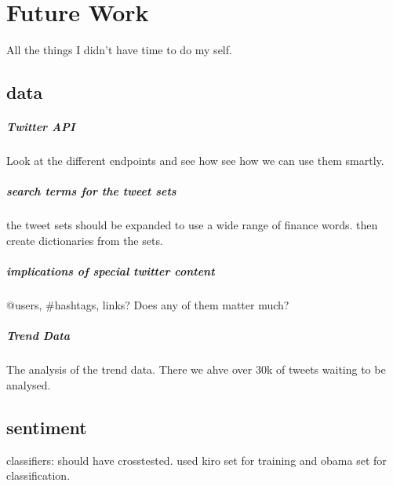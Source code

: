 
\chapter{Future Work}\label{futurework}
All the things I didn't have time to do my self. 

\section{data}
\paragraph{Twitter API}
Look at the different endpoints and see how see how we can use them smartly.

\paragraph{search terms for the tweet sets}
the tweet sets should be expanded to use a wide range of finance words. then
create dictionaries from the sets. 

\paragraph{implications of special twitter content}
@users, #hashtags, links? Does any of them matter much?

\paragraph{Trend Data}
The analysis of the trend data. There we ahve over 30k of tweets waiting to be
analysed. 

\section{sentiment}

classifiers:
should have crosstested. used kiro set for training and obama set for
classification.
